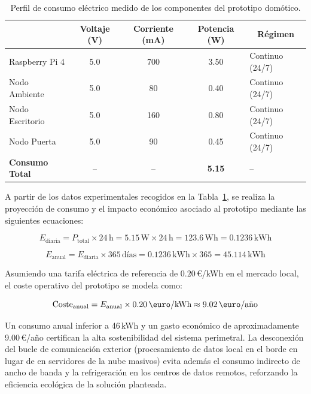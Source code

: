 \begin{table}[H]
    \centering
    \small
    \renewcommand{\arraystretch}{1.2}
    \setlength{\tabcolsep}{3pt}
    \begin{tabular}{|l|c|c|c|l|}
        \hline
        \rowcolor[gray]{0.9} 
        \multicolumn{1}{|c|}{\textbf{Componente}} & \textbf{Voltaje (V)} & \textbf{Corriente (mA)} & \textbf{Potencia (W)} & \multicolumn{1}{c|}{\textbf{Régimen}} \\ \hline
        Raspberry Pi 4       & 5.0 & 700 & 3.50 & Continuo (24/7) \\ \hline
        Nodo Ambiente        & 5.0 & 80  & 0.40 & Continuo (24/7) \\ \hline
        Nodo Escritorio      & 5.0 & 160 & 0.80 & Continuo (24/7) \\ \hline
        Nodo Puerta          & 5.0 & 90  & 0.45 & Continuo (24/7) \\ \hline
        \textbf{Consumo Total} & -- & -- & \textbf{5.15} & -- \\ \hline
    \end{tabular}
    \caption{Perfil de consumo eléctrico medido de los componentes del prototipo domótico.}
    \label{tbl:consumo_electrico}
\end{table}

A partir de los datos experimentales recogidos en la Tabla~\ref{tbl:consumo_electrico}, se realiza la proyección de consumo y el impacto económico asociado al prototipo mediante las siguientes ecuaciones:

\begin{equation}
    E_{\text{diaria}} = P_{\text{total}} \times 24\,\text{h} = 5.15\,\text{W} \times 24\,\text{h} = 123.6\,\text{Wh} = 0.1236\,\text{kWh}
\end{equation}

\begin{equation}
    E_{\text{anual}} = E_{\text{diaria}} \times 365\,\text{días} = 0.1236\,\text{kWh} \times 365 = 45.114\,\text{kWh}
\end{equation}

Asumiendo una tarifa eléctrica de referencia de $0.20$\,\euro/kWh en el mercado local, el coste operativo del prototipo se modela como:

\begin{equation}
    \text{Coste}_{\text{anual}} = E_{\text{anual}} \times 0.20\,\text{\euro/kWh} \approx 9.02\,\text{\euro/año}
\end{equation}

Un consumo anual inferior a 46\,kWh y un gasto económico de aproximadamente 9.00\,\euro/año certifican la alta sostenibilidad del sistema perimetral. La desconexión del bucle de comunicación exterior (procesamiento de datos local en el borde en lugar de en servidores de la nube masivos) evita además el consumo indirecto de ancho de banda y la refrigeración en los centros de datos remotos, reforzando la eficiencia ecológica de la solución planteada.

